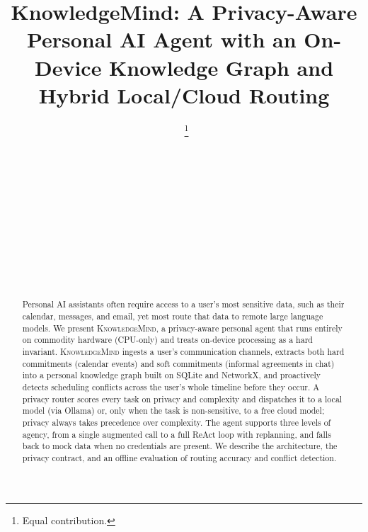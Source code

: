 \documentclass{ecai}
\newcommand{\km}{\textsc{KnowledgeMind}}
\begin{document}

\begin{frontmatter}




\title{KnowledgeMind: A Privacy-Aware Personal AI Agent with an
On-Device Knowledge Graph and Hybrid Local/Cloud Routing}


\author[A]{~\footnote{Equal contribution.}}
\author[A]{~\footnotemark}
\author[A]{~\footnotemark}
\author[A]{~\footnotemark}
\author[A]{~\footnotemark}
\author[A]{~\footnotemark}
\author[A]{~\footnotemark}

\address[A]{Indian Institute of Science, Bengaluru, India}


\begin{abstract}
Personal AI assistants often require access to a user's most sensitive
data, such as their calendar, messages, and email, yet most route that data to
remote large language models. We present \km, a privacy-aware personal agent
that runs entirely on commodity hardware (CPU-only) and treats on-device
processing as a hard invariant. \km{} ingests a user's communication channels,
extracts both hard commitments (calendar events) and soft commitments (informal
agreements in chat) into a personal knowledge graph built on SQLite and
NetworkX, and proactively detects scheduling conflicts across the user's whole
timeline before they occur. A privacy router scores every task on privacy and
complexity and dispatches it to a local model (via Ollama) or, only when the
task is non-sensitive, to a free cloud model; privacy always takes precedence
over complexity. The agent supports three levels of agency, from a single
augmented call to a full ReAct loop with replanning, and falls back to mock data
when no credentials are present. We describe the architecture, the privacy contract,
and an offline evaluation of routing accuracy and conflict detection.
\end{abstract}

\end{frontmatter}
\end{document}
